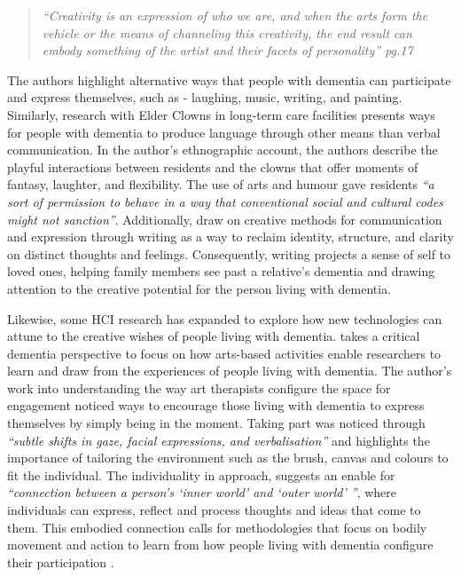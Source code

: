 \begin{quote}\textit{``Creativity is an expression of who we are, and when the arts form the vehicle or the means of channeling this creativity, the end result can embody something of the artist and their facets of personality'' \cite{john_killick_claire_craig_creativity_2012} pg.17}
\end{quote}

The authors highlight alternative ways that people with dementia can participate and express themselves, such as - laughing, music, writing, and painting. Similarly, \cite{kontos_presence_2015} research with Elder Clowns in long-term care facilities presents ways for people with dementia to produce language through other means than verbal communication. In the author's ethnographic account, the authors describe the playful interactions between residents and the clowns that offer moments of fantasy, laughter, and flexibility. The use of arts and humour gave residents \textit{``a sort of permission to behave in a way that conventional social and cultural codes might not sanction''}. Additionally, \cite{ryan_dementia_2009} draw on creative methods for communication and expression through writing as a way to reclaim identity, structure, and clarity on distinct thoughts and feelings. Consequently, writing projects a sense of self to loved ones, helping family members see past a relative's dementia and drawing attention to the creative potential for the person living with dementia. 

Likewise, some HCI research has expanded to explore how new technologies can attune to the creative wishes of people living with dementia. \cite{lazar_critical_2017} takes a critical dementia perspective to focus on how arts-based activities enable researchers to learn and draw from the experiences of people living with dementia. The author's work into understanding the way art therapists configure the space for engagement noticed ways to encourage those living with dementia to express themselves by simply being in the moment. Taking part was noticed through \textit{``subtle shifts in gaze, facial expressions, and verbalisation''} and highlights the importance of tailoring the environment such as the brush, canvas and colours to fit the individual. The individuality in approach, suggests an enable for \textit{``connection between a person's `inner world' and `outer world' ''}, where individuals can express, reflect and process thoughts and ideas that come to them. This embodied connection calls for methodologies that focus on bodily movement and action to learn from how people living with dementia configure their participation \citep{morrissey_creative_2015}.

